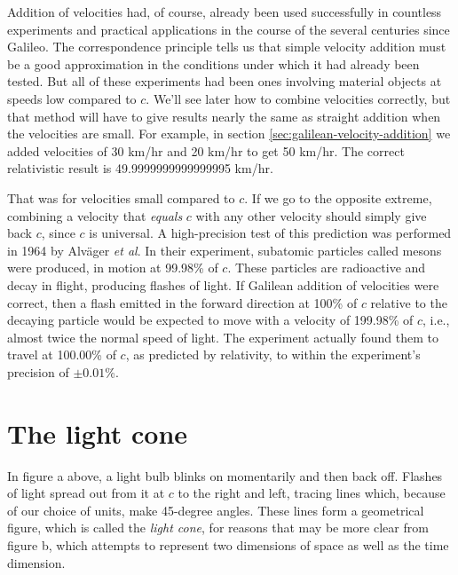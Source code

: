 Addition of velocities had, of course, already been used
successfully in countless experiments and practical applications in the course of the several
centuries since Galileo. The correspondence principle tells us that simple velocity addition
must be a good approximation in the conditions under which it had already been tested.
But all of these experiments had been ones involving material objects at speeds low compared
to $c$. We'll see later how to combine velocities correctly, but that method will have to give
results nearly the same as straight addition when the velocities are small. For example,
in section \ref{sec:galilean-velocity-addition} we added velocities of 30 km/hr and 20 km/hr
to get 50 km/hr. The correct relativistic result is 49.9999999999999995 km/hr.

That was for velocities small compared to $c$. If we go to the opposite extreme, combining
a velocity that \emph{equals} $c$ with any other velocity should simply give back $c$, since
$c$ is universal. A high-precision test of this prediction was performed in 1964 by Alv\"ager
\emph{et al}. In their experiment, subatomic particles called mesons were produced, in motion at
99.98\% of $c$.
These particles are radioactive and decay in flight, producing flashes of light. If Galilean
addition of velocities were correct, then a flash emitted in the forward direction
at 100\% of $c$ relative to the decaying particle would be expected to move with a velocity
of 199.98\% of $c$, i.e., almost twice the normal speed of light. The experiment actually
found them to travel at 100.00\% of $c$, as predicted by relativity, to within the experiment's
precision of $\pm0.01$\%.

\pagebreak

\section{The light cone}

\begin{figure}\label{fig:light-cone}
\end{figure}

In figure a above, a light bulb blinks on momentarily and then back off. Flashes of light spread out from
it at $c$ to the right and left, tracing lines which, because of our choice of units, make 45-degree angles.
These lines form a geometrical figure, which is called the \emph{light cone}, for reasons that may be more
clear from figure b, which attempts to represent two dimensions of space as well as the time dimension.

